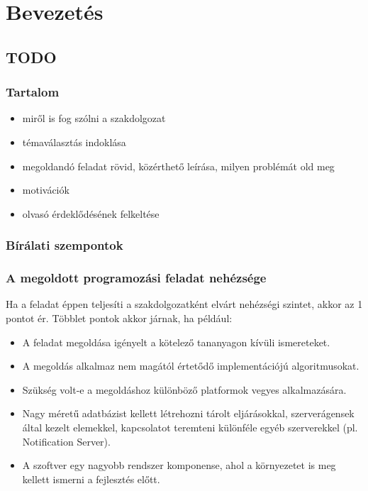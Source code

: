 \chapter{Bevezetés} %
\label{ch:intro}

\section{TODO}
\subsection{Tartalom}
\begin{itemize}
    \item miről is fog szólni a szakdolgozat
	\item témaválasztás indoklása
	\item megoldandó feladat rövid, közérthető leírása, milyen problémát old meg
	\item motivációk
	\item olvasó érdeklődésének felkeltése
\end{itemize}

\subsection{Bírálati szempontok}
\subsection{A megoldott programozási feladat nehézsége}
Ha a feladat éppen teljesíti a szakdolgozatként elvárt nehézségi szintet, akkor az 1 pontot ér. Többlet pontok akkor járnak, ha például:
\begin{itemize}
    \item A feladat megoldása igényelt a kötelező tananyagon kívüli ismereteket.
    \item A megoldás alkalmaz nem magától értetődő implementációjú algoritmusokat.
    \item Szükség volt-e a megoldáshoz különböző platformok vegyes alkalmazására.
    \item Nagy méretű adatbázist kellett létrehozni tárolt eljárásokkal, szerverágensek által kezelt elemekkel, kapcsolatot teremteni különféle egyéb szerverekkel (pl. Notification Server).
    \item A szoftver egy nagyobb rendszer komponense, ahol a környezetet is meg kellett ismerni a fejlesztés előtt.
\end{itemize}

